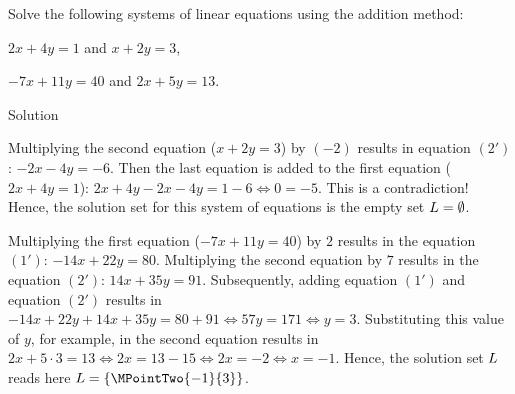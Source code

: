\begin{MExercises}
\begin{MExercise}
Solve the following systems of linear equations using the addition method:
\begin{MExerciseItems}
\item{$2 x + 4 y = 1$ and $x + 2 y = 3$,}
\item{$- 7 x + 11 y = 40$ and $2 x + 5 y = 13$.}
\end{MExerciseItems}

\begin{MHint}{Solution}
\begin{MExerciseItems}
\item{Multiplying the second equation ($x + 2 y = 3$) by $(- 2)$ results in equation $(2')$:
$- 2 x - 4 y = - 6$. Then the last equation is added to the first equation ($2 x + 4 y = 1$):
$2 x + 4 y - 2 x - 4 y = 1 - 6 \Leftrightarrow 0 = - 5$. This is a contradiction! Hence, the 
solution set for this system of equations is the empty set ${L} = \emptyset$.}
\item{Multiplying the first equation ($- 7 x + 11 y = 40$) by $2$ results in the 
equation $(1')$: $- 14 x + 22 y = 80$. Multiplying the second equation by $7$ results in
the equation $(2')$: $14 x + 35 y = 91$. Subsequently, adding equation $(1')$ and 
equation $(2')$ results in 
$- 14 x + 22 y + 14 x + 35 y = 80 + 91 \Leftrightarrow 57 y = 171 \Leftrightarrow y = 3$.
Substituting this value of $y$, for example, in the second equation results in 
$2 x + 5 \cdot 3 = 13 \Leftrightarrow
2 x = 13 - 15 \Leftrightarrow 2 x = - 2 \Leftrightarrow x = - 1$. Hence, the solution set $L$ 
reads here ${\ML} = \{ \MPointTwo{- 1}{ 3} \}$.}
\end{MExerciseItems}
\end{MHint}
\end{MExercise}


\end{MExercises}
